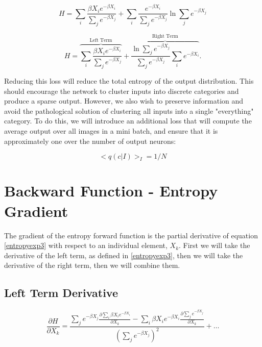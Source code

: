 \begin{displaymath}
    H =
    \sum_{i}\frac{\beta X_{i} e^{-\beta X_{i}}}{\sum_{j}e^{-\beta X_{j}}} + 
    \sum_{i}\frac{e^{-\beta X_{i}}}{\sum_{j}e^{-\beta X_{j}}}\ln{\sum_{j}e^{-\beta X_{j}}}
\label{entropyexp2}
\end{displaymath}

\begin{equation}
    H =
    \overbrace{\sum_{i}\frac{\beta X_{i}e^{-\beta X_{i}}}{\sum_{j}e^{-\beta X_{j}}}}^\text{Left Term} + 
    \overbrace{\frac{\ln{\sum_{j}e^{-\beta X_{j}}}}{\sum_{j}e^{-\beta X_{j}}}\sum_{i}e^{-\beta X_{i}}}^\text{Right Term}.
\label{entropyexp3}
\end{equation}

\noindent Reducing this loss will reduce the total entropy of the output distribution. This should encourage the network to cluster inputs into discrete categories and produce a sparse output. However, we also wish to preserve information and avoid the pathological solution of clustering all inputs into a single "everything" category. To do this, we will introduce an additional loss that will compute the average output over all images in a mini batch, and ensure that it is approximately one over the number of output neurons: 

\begin{equation}
<q(c|I)>_{I} = 1/N
\end{equation}

\section{Backward Function - Entropy Gradient} \label{backward}
\noindent The gradient of the entropy forward function is the partial derivative of equation \ref{entropyexp3} with respect to an individual element, $X_{k}$. First we will take the derivative of the left term, as defined in \ref{entropyexp3}, then we will take the derivative of the right term, then we will combine them.

\subsection{Left Term Derivative}


\begin{displaymath}
    \frac{\partial H}{\partial X_{k}} =
    \frac{\sum_{j}e^{-\beta X_{j}}\frac{\partial\sum_{i}\beta X_{i} e^{-\beta X_{i}}}{\partial X_{k}}
    - \sum_{i}\beta X_{i} e^{-\beta X_{i}}\frac{\partial\sum_{j}e^{-\beta X_{j}}}{\partial X_{k}}}{\left(\sum_{j}e^{-\beta X_{j}}\right)^{2}}
    + \ldots
\end{displaymath}

